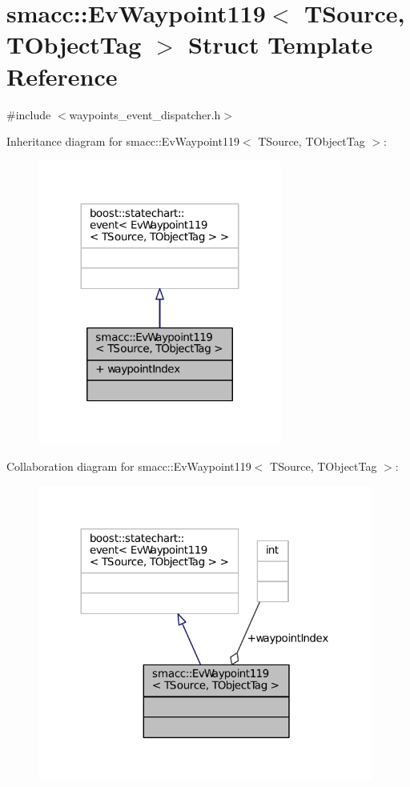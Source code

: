 \hypertarget{structsmacc_1_1EvWaypoint119}{}\section{smacc\+:\+:Ev\+Waypoint119$<$ T\+Source, T\+Object\+Tag $>$ Struct Template Reference}
\label{structsmacc_1_1EvWaypoint119}


{\ttfamily \#include $<$waypoints\+\_\+event\+\_\+dispatcher.\+h$>$}



Inheritance diagram for smacc\+:\+:Ev\+Waypoint119$<$ T\+Source, T\+Object\+Tag $>$\+:
\nopagebreak
\begin{figure}[H]
\begin{center}
\leavevmode
\includegraphics[width=227pt]{structsmacc_1_1EvWaypoint119__inherit__graph}
\end{center}
\end{figure}


Collaboration diagram for smacc\+:\+:Ev\+Waypoint119$<$ T\+Source, T\+Object\+Tag $>$\+:
\nopagebreak
\begin{figure}[H]
\begin{center}
\leavevmode
\includegraphics[width=312pt]{structsmacc_1_1EvWaypoint119__coll__graph}
\end{center}
\end{figure}
